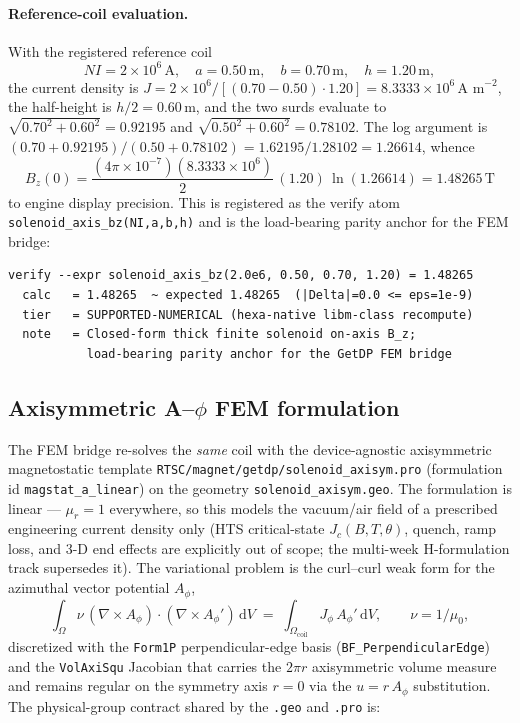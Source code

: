 \paragraph{Reference-coil evaluation.}
With the registered reference coil
\begin{equation}
NI = 2\times10^{6}\,\text{A},\quad
a = 0.50\,\text{m},\quad
b = 0.70\,\text{m},\quad
h = 1.20\,\text{m},
\label{eq:app:refcoil}
\end{equation}
the current density is $J = 2\times10^{6}/[(0.70-0.50)\cdot1.20] =
8.3333\times10^{6}\,\text{A m}^{-2}$, the half-height is $h/2 = 0.60$\,m, and the
two surds evaluate to $\sqrt{0.70^{2}+0.60^{2}} = 0.92195$ and
$\sqrt{0.50^{2}+0.60^{2}} = 0.78102$. The log argument is
$(0.70+0.92195)/(0.50+0.78102) = 1.62195/1.28102 = 1.26614$, whence
\begin{equation}
B_z(0) = \frac{(4\pi\times10^{-7})(8.3333\times10^{6})}{2}\,(1.20)\,
         \ln(1.26614) = 1.48265\,\text{T}
\label{eq:app:refeval}
\end{equation}
to engine display precision. This is registered as the verify atom
\texttt{solenoid\_axis\_bz(NI,a,b,h)} and is the load-bearing parity anchor
for the FEM bridge:
\begin{lstlisting}
verify --expr solenoid_axis_bz(2.0e6, 0.50, 0.70, 1.20) = 1.48265
  calc   = 1.48265  ~ expected 1.48265  (|Delta|=0.0 <= eps=1e-9)
  tier   = SUPPORTED-NUMERICAL (hexa-native libm-class recompute)
  note   = Closed-form thick finite solenoid on-axis B_z;
           load-bearing parity anchor for the GetDP FEM bridge
\end{lstlisting}

\subsection{Axisymmetric A--$\phi$ FEM formulation}
\label{app:magnet:fem}

The FEM bridge re-solves the \emph{same} coil with the device-agnostic
axisymmetric magnetostatic template \texttt{RTSC/magnet/getdp/solenoid\_axisym.pro}
(formulation id \texttt{magstat\_a\_linear}) on the geometry
\texttt{solenoid\_axisym.geo}. The formulation is linear --- $\mu_r=1$
everywhere, so this models the vacuum/air field of a prescribed engineering
current density only (HTS critical-state $J_c(B,T,\theta)$, quench, ramp loss,
and 3-D end effects are explicitly out of scope; the multi-week H-formulation
track supersedes it). The variational problem is the curl--curl weak form for
the azimuthal vector potential $A_\phi$,
\begin{equation}
\int_{\Omega} \nu\,(\nabla\times A_\phi)\cdot(\nabla\times A_\phi')\,
  \mathrm{d}V \;=\; \int_{\Omega_{\text{coil}}} J_\phi\,A_\phi'\,\mathrm{d}V,
\qquad \nu = 1/\mu_0,
\label{eq:app:weak}
\end{equation}
discretized with the \texttt{Form1P} perpendicular-edge basis
(\texttt{BF\_PerpendicularEdge}) and the \texttt{VolAxiSqu} Jacobian that
carries the $2\pi r$ axisymmetric volume measure and remains regular on the
symmetry axis $r=0$ via the $u = r\,A_\phi$ substitution. The physical-group
contract shared by the \texttt{.geo} and \texttt{.pro} is:

